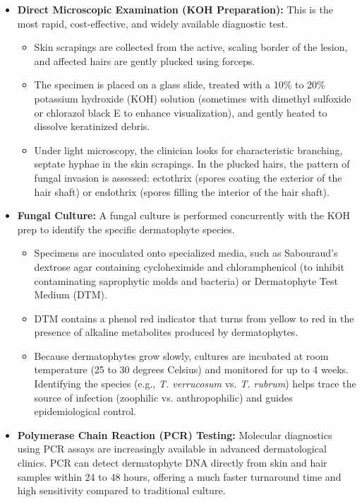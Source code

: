 \begin{itemize}
    \item \textbf{Direct Microscopic Examination (KOH Preparation):} This is the most rapid, cost-effective, and widely available diagnostic test.
    \begin{itemize}
        \item Skin scrapings are collected from the active, scaling border of the lesion, and affected hairs are gently plucked using forceps.
        \item The specimen is placed on a glass slide, treated with a 10\% to 20\% potassium hydroxide (KOH) solution (sometimes with dimethyl sulfoxide or chlorazol black E to enhance visualization), and gently heated to dissolve keratinized debris.
        \item Under light microscopy, the clinician looks for characteristic branching, septate hyphae in the skin scrapings. In the plucked hairs, the pattern of fungal invasion is assessed: ectothrix (spores coating the exterior of the hair shaft) or endothrix (spores filling the interior of the hair shaft).
    \end{itemize}
    \item \textbf{Fungal Culture:} A fungal culture is performed concurrently with the KOH prep to identify the specific dermatophyte species.
    \begin{itemize}
        \item Specimens are inoculated onto specialized media, such as Sabouraud's dextrose agar containing cycloheximide and chloramphenicol (to inhibit contaminating saprophytic molds and bacteria) or Dermatophyte Test Medium (DTM).
        \item DTM contains a phenol red indicator that turns from yellow to red in the presence of alkaline metabolites produced by dermatophytes.
        \item Because dermatophytes grow slowly, cultures are incubated at room temperature (25 to 30 degrees Celsius) and monitored for up to 4 weeks. Identifying the species (e.g., \textit{T. verrucosum} vs. \textit{T. rubrum}) helps trace the source of infection (zoophilic vs. anthropophilic) and guides epidemiological control.
    \end{itemize}
    \item \textbf{Polymerase Chain Reaction (PCR) Testing:} Molecular diagnostics using PCR assays are increasingly available in advanced dermatological clinics. PCR can detect dermatophyte DNA directly from skin and hair samples within 24 to 48 hours, offering a much faster turnaround time and high sensitivity compared to traditional culture.

\end{itemize}
